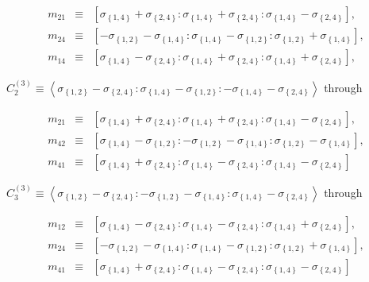\documentclass[11pt]{article}
\begin{document}
\begin{eqnarray*}
m_{21} &\equiv &\left[ \sigma _{\left\{ 1,4\right\} }+\sigma _{\left\{
2,4\right\} }:\sigma _{\left\{ 1,4\right\} }+\sigma _{\left\{ 2,4\right\}
}:\sigma _{\left\{ 1,4\right\} }-\sigma _{\left\{ 2,4\right\} }\right] , \\
m_{24} &\equiv &\left[ -\sigma _{\left\{ 1,2\right\} }-\sigma _{\left\{
1,4\right\} }:\sigma _{\left\{ 1,4\right\} }-\sigma _{\left\{ 1,2\right\}
}:\sigma _{\left\{ 1,2\right\} }+\sigma _{\left\{ 1,4\right\} }\right] , \\
m_{14} &\equiv &\left[ \sigma _{\left\{ 1,4\right\} }-\sigma _{\left\{
2,4\right\} }:\sigma _{\left\{ 1,4\right\} }+\sigma _{\left\{ 2,4\right\}
}:\sigma _{\left\{ 1,4\right\} }+\sigma _{\left\{ 2,4\right\} }\right] ,
\end{eqnarray*}

$C_{2}^{\left( 3\right) }\equiv \left\langle \sigma _{\left\{ 1,2\right\}
}-\sigma _{\left\{ 2,4\right\} }:\sigma _{\left\{ 1,4\right\} }-\sigma
_{\left\{ 1,2\right\} }:-\sigma _{\left\{ 1,4\right\} }-\sigma _{\left\{
2,4\right\} }\right\rangle $ through

\begin{eqnarray*}
m_{21} &\equiv &\left[ \sigma _{\left\{ 1,4\right\} }+\sigma _{\left\{
2,4\right\} }:\sigma _{\left\{ 1,4\right\} }+\sigma _{\left\{ 2,4\right\}
}:\sigma _{\left\{ 1,4\right\} }-\sigma _{\left\{ 2,4\right\} }\right] , \\
m_{42} &\equiv &\left[ \sigma _{\left\{ 1,4\right\} }-\sigma _{\left\{
1,2\right\} }:-\sigma _{\left\{ 1,2\right\} }-\sigma _{\left\{ 1,4\right\}
}:\sigma _{\left\{ 1,2\right\} }-\sigma _{\left\{ 1,4\right\} }\right] , \\
m_{41} &\equiv &\left[ \sigma _{\left\{ 1,4\right\} }+\sigma _{\left\{
2,4\right\} }:\sigma _{\left\{ 1,4\right\} }-\sigma _{\left\{ 2,4\right\}
}:\sigma _{\left\{ 1,4\right\} }-\sigma _{\left\{ 2,4\right\} }\right] 
\end{eqnarray*}

$C_{3}^{\left( 3\right) }\equiv \left\langle \sigma _{\left\{ 1,2\right\}
}-\sigma _{\left\{ 2,4\right\} }:-\sigma _{\left\{ 1,2\right\} }-\sigma
_{\left\{ 1,4\right\} }:\sigma _{\left\{ 1,4\right\} }-\sigma _{\left\{
2,4\right\} }\right\rangle $ through

\begin{eqnarray*}
m_{12} &\equiv &\left[ \sigma _{\left\{ 1,4\right\} }-\sigma _{\left\{
2,4\right\} }:\sigma _{\left\{ 1,4\right\} }-\sigma _{\left\{ 2,4\right\}
}:\sigma _{\left\{ 1,4\right\} }+\sigma _{\left\{ 2,4\right\} }\right] , \\
m_{24} &\equiv &\left[ -\sigma _{\left\{ 1,2\right\} }-\sigma _{\left\{
1,4\right\} }:\sigma _{\left\{ 1,4\right\} }-\sigma _{\left\{ 1,2\right\}
}:\sigma _{\left\{ 1,2\right\} }+\sigma _{\left\{ 1,4\right\} }\right] , \\
m_{41} &\equiv &\left[ \sigma _{\left\{ 1,4\right\} }+\sigma _{\left\{
2,4\right\} }:\sigma _{\left\{ 1,4\right\} }-\sigma _{\left\{ 2,4\right\}
}:\sigma _{\left\{ 1,4\right\} }-\sigma _{\left\{ 2,4\right\} }\right] 
\end{eqnarray*}
\end{document}
